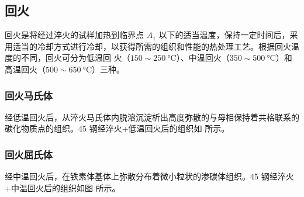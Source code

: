 \documentclass[a4paper,utf8]{article}
\begin{document}
    \subsection{回火}
        回火是将经过淬火的试样加热到临界点 $A_1$ 以下的适当温度，保持一定时间后，采用适当的冷却方式进行冷却，以获得所需的组织和性能的热处理工艺。根据回火温度的不同，回火可分为低温回
        火（$150 \sim 250~\unit{\degreeCelsius}$）、中温回火（$350 \sim 500~\unit{\degreeCelsius}$）和高温回火（$500 \sim 650~\unit{\degreeCelsius}$）三种。
            \subsubsection{回火马氏体}
                经低温回火后，从淬火马氏体内脱溶沉淀析出高度弥散的与母相保持着共格联系的碳化物质点的组织。45 钢经淬火+低温回火后的组织如 所示。
            \subsubsection{回火屈氏体}
                经中温回火后，在铁素体基体上弥散分布着微小粒状的渗碳体组织。45 钢经淬火+中温回火后的组织如图 所示。
\end{document}
